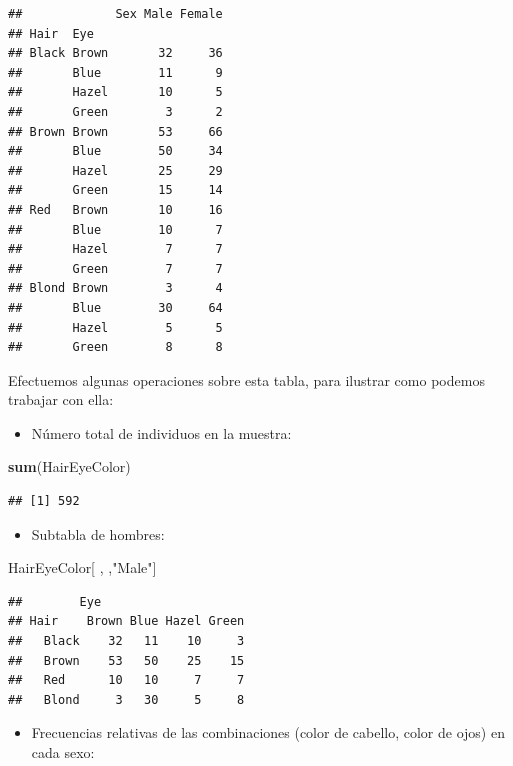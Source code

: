 \documentclass[]{book}
\newenvironment{Shaded}{\begin{snugshade}}{\end{snugshade}}
\newcommand{\KeywordTok}[1]{\textcolor[rgb]{0.13,0.29,0.53}{\textbf{#1}}}
\newcommand{\NormalTok}[1]{#1}
\newcommand{\StringTok}[1]{\textcolor[rgb]{0.31,0.60,0.02}{#1}}
\providecommand{\tightlist}{%
  \setlength{\itemsep}{0pt}\setlength{\parskip}{0pt}}
\theoremstyle{definition}
\theoremstyle{definition}
\theoremstyle{definition}
\theoremstyle{remark}
\begin{document}
\begin{verbatim}
##             Sex Male Female
## Hair  Eye                  
## Black Brown       32     36
##       Blue        11      9
##       Hazel       10      5
##       Green        3      2
## Brown Brown       53     66
##       Blue        50     34
##       Hazel       25     29
##       Green       15     14
## Red   Brown       10     16
##       Blue        10      7
##       Hazel        7      7
##       Green        7      7
## Blond Brown        3      4
##       Blue        30     64
##       Hazel        5      5
##       Green        8      8
\end{verbatim}

Efectuemos algunas operaciones sobre esta tabla, para ilustrar como podemos trabajar con ella:

\begin{itemize}
\tightlist
\item
  Número total de individuos en la muestra:
\end{itemize}

\begin{Shaded}
\begin{Highlighting}[]
\KeywordTok{sum}\NormalTok{(HairEyeColor)}
\end{Highlighting}
\end{Shaded}

\begin{verbatim}
## [1] 592
\end{verbatim}

\begin{itemize}
\tightlist
\item
  Subtabla de hombres:
\end{itemize}

\begin{Shaded}
\begin{Highlighting}[]
\NormalTok{HairEyeColor[ , ,}\StringTok{"Male"}\NormalTok{]}
\end{Highlighting}
\end{Shaded}

\begin{verbatim}
##        Eye
## Hair    Brown Blue Hazel Green
##   Black    32   11    10     3
##   Brown    53   50    25    15
##   Red      10   10     7     7
##   Blond     3   30     5     8
\end{verbatim}

\begin{itemize}
\tightlist
\item
  Frecuencias relativas de las combinaciones (color de cabello, color de ojos) en cada sexo:
\end{itemize}
\end{document}
